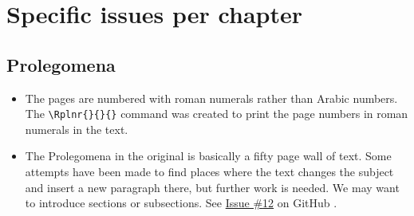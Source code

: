 \documentclass{report}
\newcommand{\SeeIssue}[1]{%
See \textcolor{blue}{%
\href{https://github.com/DomoViridi/Scaliger/issues/#1}%
{Issue \#{#1}}%
} on GitHub%
}
\begin{document}
\chapter{Specific issues per chapter}

\section{Prolegomena}
\begin{itemize}
\item
The pages are numbered with roman numerals rather than Arabic numbers.
The \verb+\Rplnr{}{}{}+ command
was created to print the page numbers in roman numerals in the text.
\item
The Prolegomena in the original is basically a fifty page wall of text.
Some attempts have been made to find places where the text changes the subject
and insert a new paragraph there, but further work is needed.
We may want to introduce sections or subsections.
\SeeIssue{12}.
\end{itemize}

\end{document}
